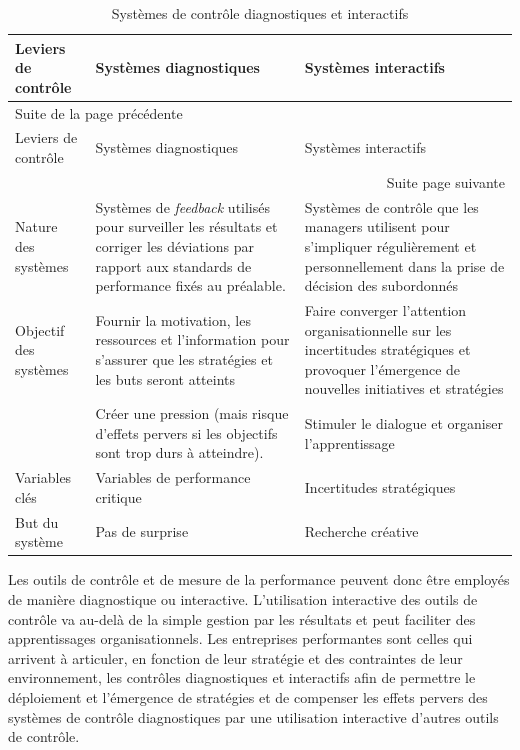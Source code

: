 \documentclass[oneside]{kaobook}
\begin{document}
{\sidenotesize
\begin{longtable}{p{2cm} p{7cm} p{7cm}}
\caption{Systèmes de contrôle diagnostiques et interactifs}
\\
Leviers de contrôle & Systèmes diagnostiques & Systèmes interactifs\\
\hline
\endfirsthead
\multicolumn{3}{l}{Suite de la page précédente} \\
\hline

Leviers de contrôle & Systèmes diagnostiques & Systèmes interactifs \\

\hline
\endhead
\hline\multicolumn{3}{r}{Suite page suivante} \\
\endfoot
\endlastfoot
\hline
Nature des systèmes & Systèmes de \emph{feedback} utilisés pour surveiller les résultats et corriger les déviations par rapport aux standards de performance fixés au préalable. & Systèmes de contrôle que les managers utilisent pour s'impliquer régulièrement et personnellement dans la prise de décision des subordonnés\\
Objectif des systèmes & Fournir la motivation, les ressources et l'information pour s'assurer que les stratégies et les buts seront atteints & Faire converger l'attention organisationnelle sur les incertitudes stratégiques et provoquer l'émergence de nouvelles initiatives et stratégies\\
 & Créer une pression (mais risque d'effets pervers si les objectifs sont trop durs à atteindre). & Stimuler le dialogue et organiser l'apprentissage\\
Variables clés & Variables de performance critique & Incertitudes stratégiques\\
But du système & Pas de surprise & Recherche créative\\
\end{longtable}}

Les outils de contrôle et de mesure de la performance peuvent donc être employés de manière diagnostique ou interactive. L'utilisation interactive des outils de contrôle va au-delà de la simple gestion par les résultats et peut faciliter des apprentissages organisationnels. Les entreprises performantes sont celles qui arrivent à articuler, en fonction de leur stratégie et des contraintes de leur environnement, les contrôles diagnostiques et interactifs afin de permettre le déploiement et l'émergence de stratégies et de compenser les effets pervers des systèmes de contrôle diagnostiques par une utilisation interactive d'autres outils de contrôle.
\end{document}
